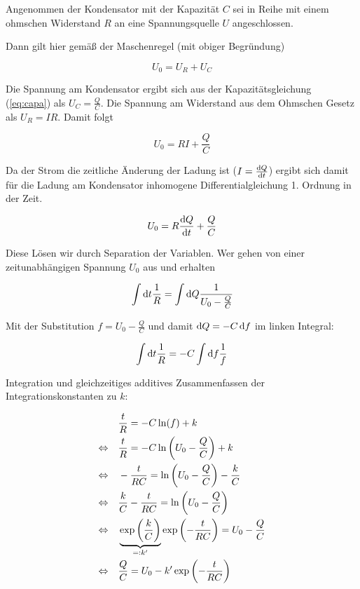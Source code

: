 \documentclass[a4paper,german,12pt,smallheadings]{scrartcl}
\begin{document}
Angenommen der Kondensator mit der Kapazität $C$ sei in Reihe mit einem
ohmschen Widerstand $R$ an eine Spannungsquelle $U$ angeschlossen.


Dann gilt hier gemäß der Maschenregel (mit obiger Begründung)

\begin{equation}
  U_0 = U_R + U_C
\end{equation}

Die Spannung am Kondensator ergibt sich aus der Kapazitätsgleichung
(\ref{eq:capa}) als $U_C = \frac{Q}{C}$. Die Spannung am Widerstand aus dem
Ohmschen Gesetz als $U_R = IR$. Damit folgt


\begin{equation}
  U_0 = R I  + \frac{Q}{C}
\end{equation}

Da der Strom die zeitliche Änderung der Ladung ist ($I = \frac{\dif Q}{\dif
t}$) ergibt sich damit für die Ladung am Kondensator inhomogene
Differentialgleichung 1. Ordnung in der Zeit.

\begin{equation}
  U_0 = R \frac{\dif Q}{\dif t} + \frac{Q}{C}
\end{equation}

Diese Lösen wir durch Separation der Variablen. Wer gehen von einer
zeitunabhängigen Spannung $U_0$ aus und erhalten

\begin{equation}
  \int \dif t \frac{1}{R} = \int \dif Q \frac{1}{U_0 - \frac{Q}{C}}
\end{equation}

Mit der Substitution $f = U_0 - \frac{Q}{C}$ und damit $\dif Q = -C \dif f$ im
linken Integral:

\begin{equation}
  \int \dif t \frac{1}{R} = -C \int \dif f \frac{1}{f}
\end{equation}

Integration und gleichzeitiges additives Zusammenfassen der
Integrationskonstanten zu $k$:

\begin{align*}
  &\frac{t}{R} = -C \ln(f) + k \\
  \Leftrightarrow\quad&
  \frac{t}{R} = -C \ln\del{U_0 - \frac{Q}{C}} + k \\
  \Leftrightarrow\quad&
  -\frac{t}{RC} = \ln\del{U_0 - \frac{Q}{C}} - \frac{k}{C} \\
  \Leftrightarrow\quad&
  \frac{k}{C}-\frac{t}{RC} = \ln\del{U_0 - \frac{Q}{C}} \\
  \Leftrightarrow\quad&
  \underbrace{\exp\del{\frac{k}{C}}}_{=: k'} \exp \del{-\frac{t}{RC}} = U_0 - \frac{Q}{C} \\
  \Leftrightarrow\quad&
  \frac{Q}{C} = U_0 - k' \exp \del{-\frac{t}{RC}}
\end{align*}
\end{document}
